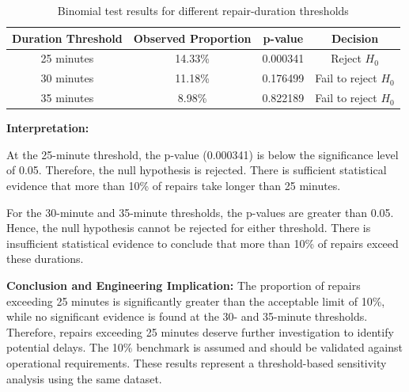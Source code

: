 \begin{table}[htbp]
    \centering
    \caption{Binomial test results for different repair-duration thresholds}
    \label{tab:q16_binomial}
    \begin{tabular}{|c|c|c|c|}
        \hline
        \textbf{Duration Threshold} &
        \textbf{Observed Proportion} &
        \textbf{p-value} &
        \textbf{Decision} \\
        \hline
        25 minutes & 14.33\% & 0.000341 & Reject $H_0$ \\
        \hline
        30 minutes & 11.18\% & 0.176499 & Fail to reject $H_0$ \\
        \hline
        35 minutes & 8.98\% & 0.822189 & Fail to reject $H_0$ \\
        \hline
    \end{tabular}
\end{table}

\textbf{Interpretation:}

At the 25-minute threshold, the p-value (0.000341) is below the significance level
of 0.05. Therefore, the null hypothesis is rejected. There is sufficient statistical
evidence that more than 10\% of repairs take longer than 25 minutes.

For the 30-minute and 35-minute thresholds, the p-values are greater than 0.05.
Hence, the null hypothesis cannot be rejected for either threshold. There is
insufficient statistical evidence to conclude that more than 10\% of repairs exceed
these durations.

\textbf{Conclusion and Engineering Implication:}
The proportion of repairs exceeding 25 minutes is significantly greater than the acceptable limit of 10\%, while no significant evidence is found at the 30- and 35-minute thresholds. Therefore, repairs exceeding 25 minutes deserve further investigation to identify potential delays. The 10\% benchmark is assumed and should be validated against operational requirements. These results represent a threshold-based sensitivity analysis using the same dataset.